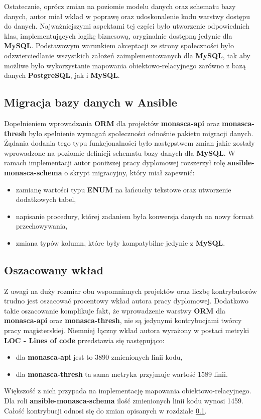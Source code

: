     Ostatecznie, oprócz zmian na poziomie modelu danych oraz schematu bazy danych, autor miał wkład w poprawę oraz udoskonalenie
    kodu warstwy dostępu do danych. Najważniejszymi aspektami tej części było utworzenie odpowiednich klas, implementujących logikę
    biznesową, oryginalnie dostępną jedynie dla \textbf{MySQL}. Podstawowym warunkiem akceptacji ze strony społeczności było
    odzwierciedlanie wszystkich założeń zaimplementowanych dla \textbf{MySQL}, tak aby możliwe było wykorzystanie mapowania obiektowo-relacyjnego
    zarówno z bazą danych \textbf{PostgreSQL}, jak i \textbf{MySQL}.
    
    \subsection{Migracja bazy danych w Ansible}
    \label{chapter:application:own_work:orm:ansible_migration}
    Dopełnieniem wprowadzania \textbf{ORM} dla projektów \textbf{monasca-api} oraz \textbf{monasca-thresh} było spełnienie
    wymagań społeczności odnośnie pakietu migracji danych. Żądania dodania tego typu funkcjonalności było następstwem zmian jakie
    zostały wprowadzone na poziomie definicji schematu bazy danych dla \textbf{MySQL}. W ramach implementacji autor poniższej pracy dyplomowej
    rozszerzył rolę \textbf{ansible-monasca-schema} o skrypt migracyjny, który miał zapewnić:
    \begin{itemize}
        \item zamianę wartości typu \textbf{ENUM} na łańcuchy tekstowe oraz utworzenie dodatkowych tabel,
        \item napisanie procedury, której zadaniem była konwersja danych na nowy format przechowywania,
        \item zmiana typów kolumn, które były kompatybilne jedynie z \textbf{MySQL}.
    \end{itemize}
    
    \subsection{Oszacowany wkład}
    Z uwagi na duży rozmiar obu wspomnianych projektów oraz liczbę kontrybutorów trudno jest oszacować procentowy wkład 
    autora pracy dyplomowej. Dodatkowo takie oszacowanie komplikuje fakt, że wprowadzenie warstwy \textbf{ORM} dla 
    \textbf{monasca-api} oraz \textbf{monasca-thresh}, nie są jedynymi kontrybucjami twórcy pracy magisterskiej. Niemniej
    łączny wkład autora wyrażony w postaci metryki \textbf{LOC - Lines of code} przedstawia się następująco:
    \begin{itemize}
        \item dla \textbf{monasca-api} jest to 3890 zmienionych linii kodu,
        \item dla \textbf{monasca-thresh} ta sama metryka przyjmuje wartość 1589 linii.
    \end{itemize}
    Większość z nich przypada na implementację mapowania obiektowo-relacyjnego.
    Dla roli \textbf{ansible-monasca-schema} ilość zmienionych linii kodu wynosi 1459. Całość kontrybucji odnosi się do 
    zmian opisanych w rozdziale \ref{chapter:application:own_work:orm:ansible_migration}.

